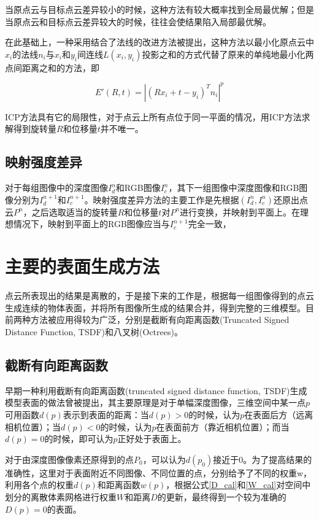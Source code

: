 \documentclass{llncs}
\begin{document}
\begin{CJK}{UTF8}{song}
当原点云与目标点云差异较小的时候，这种方法有较大概率找到全局最优解；但是当原点云和目标点云差异较大的时候，往往会使结果陷入局部最优解。

在此基础上，一种采用结合了法线的改进方法被提出\cite{Chen1992Object}，这种方法以最小化原点云中$x_i$的法线$n_i$与$x_i$和$y_i$间连线$L(x_i,y_i)$投影之和的方式代替了原来的单纯地最小化两点间距离之和的方法，即

\begin{equation}
E'(R,t) = |(Rx_i+t-y_i)^Tn_i|^p
\end{equation}

ICP方法具有它的局限性，对于点云上所有点位于同一平面的情况，用ICP方法求解得到旋转量$R$和位移量$t$并不唯一。

	\subsection{映射强度差异}

对于每组图像中的深度图像$I^n_d$和RGB图像$I^n_c$，其下一组图像中深度图像和RGB图像分别为$I^{n+1}_d$和$I^{n+1}_c$。映射强度差异方法的主要工作是先根据$(I^n_d,I^n_c)$还原出点云$P^n$，之后选取适当的旋转量$R$和位移量$t$对$P^n$进行变换，并映射到平面上。在理想情况下，映射到平面上的RGB图像应当与$I^{n+1}_c$完全一致，

\section{主要的表面生成方法}

点云所表现出的结果是离散的，于是接下来的工作是，根据每一组图像得到的点云生成连续的物体表面，并将所有图像所生成的结果合并，得到完整的三维模型。目前两种方法被应用得较为广泛，分别是截断有向距离函数(Truncated Signed Distance Function, TSDF)和八叉树(Octrees)。

\subsection{截断有向距离函数}

早期一种利用截断有向距离函数(truncated signed distance function, TSDF)生成模型表面的做法\cite{DBLP:conf/siggraph/CurlessL96}曾被提出，其主要原理是对于单幅深度图像，三维空间中某一点$p$可用函数$d(p)$表示到表面的距离：当$d(p)>0$的时候，认为$p$在表面后方（远离相机位置）；当$d(p)<0$的时候，认为$p$在表面前方（靠近相机位置）；而当$d(p)=0$的时候，即可认为$p$正好处于表面上。

对于由深度图像像素还原得到的点$P_0$，可以认为$d(p_0)$接近于0。为了提高结果的准确性，这里对于表面附近不同图像、不同位置的点，分别给予了不同的权重w，利用各个点的权重$d(p)$和距离函数$w(p)$，根据公式\ref{D_cal}和\ref{W_cal}对空间中划分的离散体素网格进行权重$W$和距离$D$的更新，最终得到一个较为准确的$D(p)=0$的表面。


\end{CJK}
\end{document}
